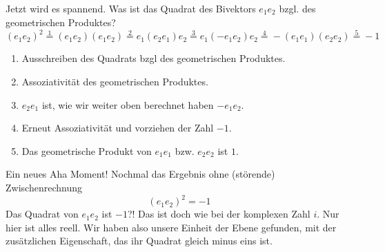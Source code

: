 \documentclass[fleqn]{scrartcl}
\numberwithin{equation}{section}
\begin{document}
\begin{center}
\begin{minipage}{\linewidth}
\centering
{}
\label{fig:orientationPlane2}
\end{minipage}
\end{center}
Jetzt wird es spannend. Was ist das Quadrat des Bivektors $e_1e_2$ bzgl. des
geometrischen Produktes?
\[(e_1e_2)^2\stackrel{1}=(e_1e_2)(e_1e_2)\stackrel{2}=e_1(e_2e_1)e_2\stackrel{3}=e_1(-e_1e_2)e_2\stackrel{4}=-(e_1e_1)(e_2e_2)\stackrel{5}=-1\]
\begin{enumerate}
    \item Ausschreiben des Quadrats bzgl des geometrischen Produktes.
    \item Assoziativität des geometrischen Produktes.
    \item $e_2e_1$ ist, wie wir weiter oben berechnet haben $-e_1e_2$.
    \item Erneut Assoziativität und vorziehen der Zahl $-1$.
    \item Das geometrische Produkt von $e_1e_1$ bzw. $e_2e_2$ ist $1$.
\end{enumerate}
Ein neues Aha Moment! Nochmal das Ergebnis ohne (störende) Zwischenrechnung
\[(e_1e_2)^2=-1\]
Das Quadrat von $e_1e_2$ ist $-1$?! Das ist doch wie bei der komplexen Zahl
$i$. Nur hier ist alles reell. Wir haben also unsere Einheit der Ebene
gefunden, mit der zusätzlichen Eigenschaft, das ihr Quadrat gleich minus eins
ist.
\end{document}
